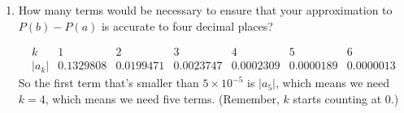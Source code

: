 \begin{enumerate}[leftmargin=0pt]
    \begin{red}
    \[P(1) - P(-1) \approx \frac{1}{\sqrt{2\pi}}\cdot  \frac{479}{560} - \left( - \frac{1}{\sqrt{2\pi}}\cdot  \frac{479}{560}\right) \approx 0.34124 + 0.34124 = 0.68248.\]
    \end{red}
    \item How many terms would be necessary to ensure that your approximation to $P(b)-P(a)$ is accurate to four decimal places? 
    \begin{red}
    \[
\begin{array}{c|c|c|c|c|c|c}
k     & 1         & 2         & 3         & 4         & 5         & 6         \\\hline
|a_k| & 0.1329808 & 0.0199471 & 0.0023747 & 0.0002309 & 0.0000189 & 0.0000013
\end{array}
    \]
    So the first term that's smaller than $5\times10^{-5}$ is $|a_5|$, which means we need $k=4$, which means we need five terms. (Remember, $k$ starts counting at 0.)
    \end{red}
\end{enumerate}

